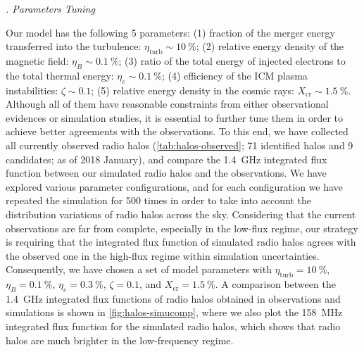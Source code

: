 \documentclass[modern]{aastex62}
\newcommand{\R}[1]{\mathrm{#1}}
\newcounter{sssseccount}
\newcommand{\sssseclabel}{\alph{sssseccount}}
\newcommand{\ssssec}[1]{%
  \vspace{1ex}%
  \stepcounter{sssseccount}%
  \noindent\emph{\sssseclabel. #1}%
}
\begin{document}
\ssssec{Parameters Tuning}

Our model has the following 5 parameters:
(1) fraction of the merger energy transferred into the turbulence:
$\eta_{\R{turb}} \sim \SI{10}{\percent}$;
(2) relative energy density of the magnetic field:
$\eta_B \sim \SI{0.1}{\percent}$;
(3) ratio of the total energy of injected electrons to the total thermal
energy: $\eta_e \sim \SI{0.1}{\percent}$;
(4) efficiency of the ICM plasma instabilities:
$\zeta \sim 0.1$;
(5) relative energy density in the cosmic rays:
$X_{\R{cr}} \sim \SI{1.5}{\percent}$.
Although all of them have reasonable constraints from either observational
evidences or simulation studies, it is essential to further tune them in
order to achieve better agreements with the observations.
To this end, we have collected all currently observed radio halos
(\autoref{tab:halos-observed}; 71 identified halos and 9 candidates;
as of 2018 January), and compare the
\SI{1.4}{\GHz} integrated flux function between our simulated radio halos
and the observations.  We have explored various parameter configurations,
and for each configuration we have repeated the simulation for 500 times
in order to take into account the distribution variations of radio halos
across the sky.
Considering that the current observations are far from complete,
especially in the low-flux regime, our strategy is requiring that the
integrated flux function of simulated radio halos agrees with the observed
one in the high-flux regime within simulation uncertainties.
Consequently, we have chosen a set of model parameters with
$\eta_{\R{turb}} = \SI{10}{\percent}$, $\eta_B = \SI{0.1}{\percent}$,
$\eta_e = \SI{0.3}{\percent}$, $\zeta = 0.1$,
and $X_{\R{cr}} = \SI{1.5}{\percent}$.
A comparison between the \SI{1.4}{\GHz} integrated flux functions of
radio halos obtained in observations and simulations is shown in
\autoref{fig:halos-simucomp},
where we also plot the \SI{158}{\MHz} integrated flux function for the
simulated radio halos, which shows that radio halos are much brighter
in the low-frequency regime.
\end{document}
